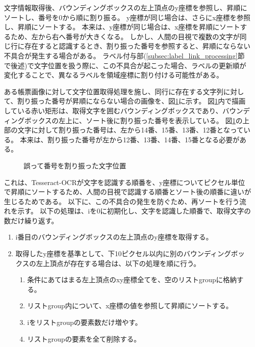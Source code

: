 文字情報取得後、バウンディングボックスの左上頂点のy座標を参照し、昇順にソートし、番号を0から順に割り振る。
y座標が同じ場合は、さらにx座標を参照し、昇順にソートする。
本来は、y座標が同じ場合は、x座標を昇順にソートするため、左から右へ番号が大きくなる。
しかし、人間の目視で複数の文字が同じ行に存在すると認識するとき、割り振った番号を参照すると、昇順にならない不具合が発生する場合がある。
ラベル付与部(\ref{subsec:label_link_processing}節で後述)で文字位置を扱う際に、この不具合が起こった場合、ラベルの更新順が変化することで、異なるラベルを領域座標に割り付ける可能性がある。

ある帳票画像に対して文字位置取得処理を施し、同行に存在する文字列に対して、割り振った番号が昇順にならない場合の画像を、図\ref{fig:before_sorted_string}に示す。
図\ref{fig:before_sorted_string}内で描画している赤い矩形は、取得文字を囲むバウンディングボックスであり、バウンディングボックスの左上に、ソート後に割り振った番号を表示している。
図\ref{fig:before_sorted_string}の上部の文字に対して割り振った番号は、左から14番、15番、13番、12番となっている。
本来は、割り振った番号が左から12番、13番、14番、15番となる必要がある。

\begin{figure}[t]
    \begin{center}
        \caption{誤って番号を割り振った文字位置}
        \label{fig:before_sorted_string}
    \end{center}
\end{figure}

これは、Tesseract-OCRが文字を認識する順番を、y座標についてピクセル単位で昇順にソートするため、人間の目視で認識する順番とソート後の順番に違いが生じるためである。
以下に、この不具合の発生を防ぐため、再ソートを行う流れを示す。
以下の処理は、iを0に初期化し、文字を認識した順番で、取得文字の数だけ繰り返す。

\begin{enumerate}
    \item i番目のバウンディングボックスの左上頂点のy座標を取得する。
    \item 取得したy座標を基準として、下10ピクセル以内に別のバウンディングボックスの左上頂点が存在する場合は、以下の処理を順に行う。
    \begin{enumerate}
        \item 条件にあてはまる左上頂点のxy座標全てを、空のリストgroupに格納する。
        \item リストgroup内について、x座標の値を参照して昇順にソートする。
        \item iをリストgroupの要素数だけ増やす。
        \item リストgroupの要素を全て削除する。
    \end{enumerate}
\end{enumerate}

